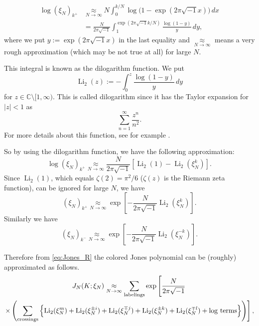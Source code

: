 \documentclass{amsart}
\newcommand{\C}{\mathbb{C}}
\newcommand{\Li}{\operatorname{Li}}
\theoremstyle{definition}
\theoremstyle{remark}
\numberwithin{equation}{section}
\begin{document}
\begin{equation*}
\begin{split}
  \log(\xi_N)_{k^{+}}
  &\underset{N\to\infty}{\approx}
  N\int_{0}^{k/N}\log\bigl(1-\exp(2\pi\sqrt{-1}x)\bigr)\,dx
  \\
  &=
  \frac{N}{2\pi\sqrt{-1}}
  \int_{1}^{\exp(2\pi\sqrt{-1}k/N)}\frac{\log(1-y)}{y}\,dy,
\end{split}
\end{equation*}
where we put $y:=\exp(2\pi\sqrt{-1}x)$ in the last equality and $\underset{N\to\infty}{\approx}$ means a very rough approximation (which may be not true at all) for large $N$.
\par
This integral is known as the dilogarithm function.
We put
\begin{equation*}
  \Li_2(z)
  :=
  -\int_{0}^{z}\frac{\log(1-y)}{y}\,dy
\end{equation*}
for $z\in\C\setminus{[1,\infty)}$.
This is called dilogarithm since it has the Taylor expansion for $|z|<1$ as
\begin{equation*}
  \sum_{n=1}^{\infty}\frac{z^n}{n^2}.
\end{equation*}
For more details about this function, see for example \cite{Zagier:2007}.
\par
So by using the dilogarithm function, we have the following approximation:
\begin{equation*}
  \log(\xi_N)_{k^{+}}
  \underset{N\to\infty}{\approx}
  \frac{N}{2\pi\sqrt{-1}}
  \left[
    \Li_2(1)-\Li_2(\xi^k_N)
  \right].
\end{equation*}
Since $\Li_2(1)$, which equals $\zeta(2)=\pi^2/6$ ($\zeta(z)$ is the Riemann zeta function), can be ignored for large $N$, we have
\begin{equation*}
  (\xi_N)_{k^{+}}
  \underset{N\to\infty}{\approx}
  \exp
  \left[
    -\frac{N}{2\pi\sqrt{-1}}\Li_2(\xi^{k}_N)
  \right].
\end{equation*}
Similarly we have
\begin{equation*}
  (\xi_N)_{k^{-}}
  \underset{N\to\infty}{\approx}
  \exp
  \left[
    -\frac{N}{2\pi\sqrt{-1}}\Li_2(\xi^{-k}_N)
  \right].
\end{equation*}
\par
Therefore from \eqref{eq:Jones_R} the colored Jones polynomial can be (roughly) approximated as follows.
\begin{multline}\label{eq:Jones_approx}
  J_N(K;\xi_N)
  \underset{N\to\infty}{\approx}
  \sum_{\text{labelings}}
  \exp
  \left[\vphantom{\sum_{\text{crossings}}}
    \frac{N}{2\pi\sqrt{-1}}
  \right.
  \\
  \left.
  \times
  \left(
    \sum_{\text{crossings}}
    \left\{
      \Li_2(\xi^m_N)
      +
      \Li_2(\xi^{\pm i}_N)
      +
      \Li_2(\xi^{\mp j}_N)
      +
      \Li_2(\xi^{\pm k}_N)
      +
      \Li_2(\xi^{\mp l}_N)
      +
      \text{$\log$ terms}
    \right\}
  \right)
  \right],
\end{multline}
\end{document}
